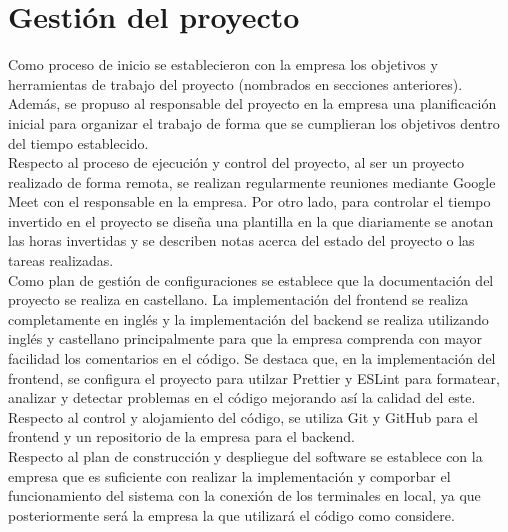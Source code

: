 \chapter{Gestión del proyecto}
\label{section-gestion-proyecto}

Como proceso de inicio se establecieron con la empresa los objetivos y herramientas de trabajo del proyecto (nombrados en secciones anteriores). Además, se propuso al responsable del proyecto en la empresa una planificación inicial para organizar el trabajo de forma que se cumplieran los objetivos dentro del tiempo establecido. \\

Respecto al proceso de ejecución y control del proyecto, al ser un proyecto realizado de forma remota, se realizan regularmente reuniones mediante Google Meet con el responsable en la empresa. Por otro lado, para controlar el tiempo invertido en el proyecto se diseña una plantilla en la que diariamente se anotan las horas invertidas y se describen notas acerca del estado del proyecto o las tareas realizadas. \\

Como plan de gestión de configuraciones se establece que la documentación del proyecto se realiza en castellano. La implementación del frontend se realiza completamente en inglés y la implementación del backend se realiza utilizando inglés y castellano principalmente para que la empresa comprenda con mayor facilidad los comentarios en el código. Se destaca que, en la implementación del frontend, se configura el proyecto para utilzar Prettier \cite{prettier} y ESLint \cite{eslint} para formatear, analizar y detectar problemas en el código mejorando así la calidad del este. Respecto al control y alojamiento del código, se utiliza Git y GitHub para el frontend y un repositorio de la empresa para el backend. \\


Respecto al plan de construcción y despliegue del software se establece con la empresa que es suficiente con realizar la implementación y comporbar el funcionamiento del sistema con la conexión de los terminales en local, ya que posteriormente será la empresa la que utilizará el código como considere. \\

